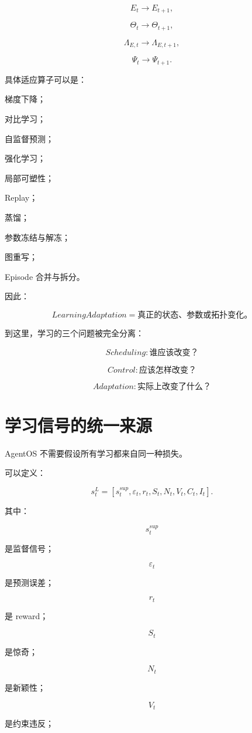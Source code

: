 \[
E_t\rightarrow E_{t+1},
\]

\[
\Theta_t\rightarrow\Theta_{t+1},
\]

\[
\Lambda_{E,t}
\rightarrow
\Lambda_{E,t+1},
\]

\[
\Psi_t
\rightarrow
\Psi_{t+1}.
\]

具体适应算子可以是：

梯度下降；

对比学习；

自监督预测；

强化学习；

局部可塑性；

Replay；

蒸馏；

参数冻结与解冻；

图重写；

Episode 合并与拆分。

因此：

\[
\boxed{
LearningAdaptation
=
\text{真正的状态、参数或拓扑变化。}
}
\]

到这里，学习的三个问题被完全分离：

\[
\boxed{
Scheduling:
\text{谁应该改变？}
}
\]

\[
\boxed{
Control:
\text{应该怎样改变？}
}
\]

\[
\boxed{
Adaptation:
\text{实际上改变了什么？}
}
\]


\section{学习信号的统一来源}

AgentOS 不需要假设所有学习都来自同一种损失。

可以定义：

\[
\boxed{
s_t^L
=
[
s_t^{sup},
\varepsilon_t,
r_t,
S_t,
N_t,
V_t,
C_t,
I_t
].
}
\]

其中：

\[
s_t^{sup}
\]

是监督信号；

\[
\varepsilon_t
\]

是预测误差；

\[
r_t
\]

是 reward；

\[
S_t
\]

是惊奇；

\[
N_t
\]

是新颖性；

\[
V_t
\]

是约束违反；

